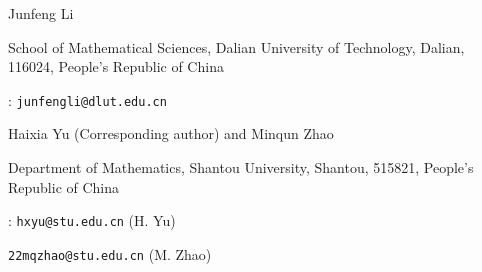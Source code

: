 \documentclass[11pt, twoside, leqno]{article}
\theoremstyle{definition}
\numberwithin{equation}{section}
\begin{document}
\bigskip

\noindent  Junfeng Li

\smallskip

\noindent  School of Mathematical Sciences, Dalian University of Technology, Dalian, 116024,  People's Republic of China

\smallskip

: \texttt{junfengli@dlut.edu.cn}

\bigskip

\noindent Haixia Yu (Corresponding author) and Minqun Zhao

\smallskip

\noindent  Department of Mathematics, Shantou University, Shantou, 515821, People's Republic of China

\smallskip

: \texttt{hxyu@stu.edu.cn} (H. Yu)

\noindent{} \texttt{22mqzhao@stu.edu.cn} (M. Zhao)
\end{document}
